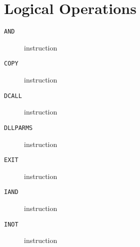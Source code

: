 \section{Logical Operations}
\begin{description}
\item[\texttt{AND}] instruction\\

\end{description}
\clearpage
\begin{description}
\item[\texttt{COPY}] instruction\\

\end{description}
\clearpage
\begin{description}
\item[\texttt{DCALL}] instruction\\

\end{description}
\clearpage
\begin{description}
\item[\texttt{DLLPARMS}] instruction\\

\end{description}
\clearpage
\begin{description}
\item[\texttt{EXIT}] instruction\\

\end{description}
\clearpage
\begin{description}
\item[\texttt{IAND}] instruction\\

\end{description}
\clearpage
\begin{description}
\item[\texttt{INOT}] instruction\\

\end{description}
\clearpage
